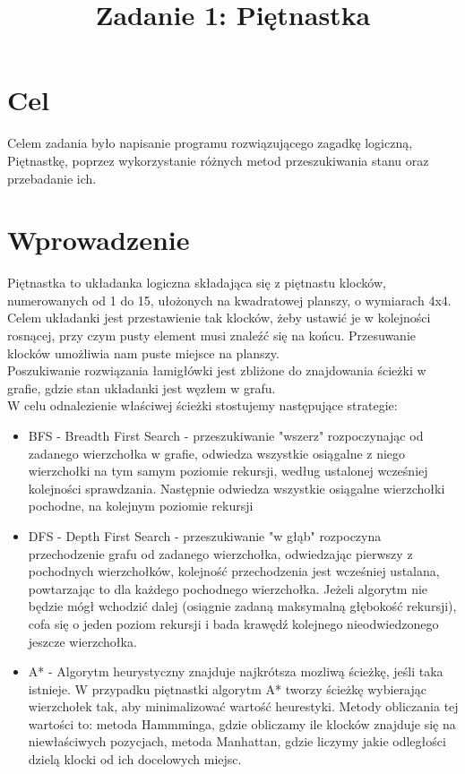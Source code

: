 \documentclass{classrep}
\author{
  \studentinfo{Maciej Pracucik}{216869} \and
  \studentinfo{Adam Jóźwiak}{nralbumu2}
}
\title{Zadanie 1: Piętnastka}
\begin{document}
\maketitle

\section{Cel}
{
Celem zadania było napisanie programu rozwiązującego zagadkę logiczną, 
Piętnastkę, poprzez wykorzystanie różnych metod przeszukiwania stanu oraz przebadanie ich.}

\section{Wprowadzenie}
{
Piętnastka to układanka logiczna składająca się z piętnastu klocków, numerowanych od 1 do 15, ułożonych na kwadratowej planszy,
o wymiarach 4x4. Celem układanki jest przestawienie tak klocków, żeby ustawić je w kolejności rosnącej, przy czym pusty element musi znaleźć się na końcu. Przesuwanie klocków umożliwia nam puste miejsce na planszy.\\
Poszukiwanie rozwiązania łamigłówki jest zbliżone do znajdowania ścieżki w grafie, gdzie stan układanki jest węzłem w grafu.\\ 
W celu odnalezienie właściwej ścieżki stostujemy następujące strategie:\\
\begin{itemize}
	\item BFS - Breadth First Search - przeszukiwanie "wszerz" rozpoczynając od zadanego wierzchołka w grafie, odwiedza wszystkie osiągalne z niego wierzchołki na tym samym poziomie rekursji, według ustalonej wcześniej kolejności sprawdzania. Następnie odwiedza wszystkie osiągalne wierzchołki pochodne, na kolejnym poziomie rekursji
	\item DFS - Depth First Search - przeszukiwanie "w głąb" rozpoczyna przechodzenie grafu od zadanego wierzchołka, odwiedzając pierwszy z pochodnych wierzchołków, kolejność przechodzenia jest wcześniej ustalana, powtarzając to dla każdego pochodnego wierzchołka. Jeżeli algorytm nie będzie mógł wchodzić dalej (osiągnie zadaną maksymalną głębokość rekursji), cofa się o jeden poziom rekursji i bada krawędź kolejnego nieodwiedzonego jeszcze wierzchołka.
	\item A* - Algorytm heurystyczny znajduje najkrótsza mozliwą ścieżkę, jeśli taka istnieje. W przypadku piętnastki algorytm A* tworzy ścieżkę wybierając wierzchołek tak, aby minimalizować wartość heurestyki. Metody obliczania tej wartości to: metoda Hammminga, gdzie obliczamy ile klocków znajduje się na niewłaściwych pozycjach, metoda Manhattan, gdzie liczymy jakie odległości dzielą klocki od ich docelowych miejsc.
\end{itemize}
}
\end{document}
